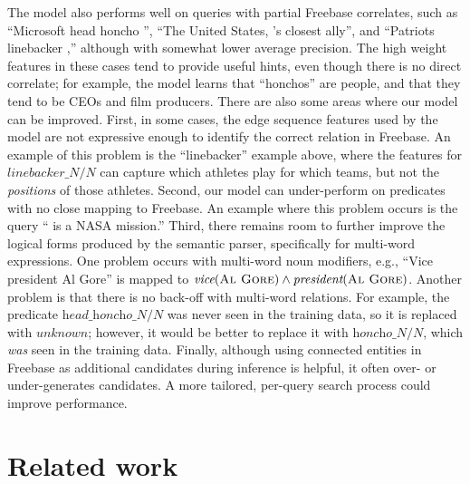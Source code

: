 \documentclass[11pt,letterpaper]{article}
\newcommand{\blank}{\underline{\hspace{.5cm}}}
\newcommand{\lexicalpredicate}[1]{\ensuremath{\textit{#1}}}
\newcommand{\entity}[1]{\ensuremath{\textsc{#1}}}
\begin{document}
The model also performs well on queries with partial Freebase correlates, such as ``Microsoft head
honcho \blank{}'', ``The United States, \blank{}'s closest ally'', and ``Patriots linebacker
\blank{},'' although with somewhat lower average precision. The high weight features in these cases
tend to provide useful hints, even though there is no direct correlate; for example, the model
learns that ``honchos'' are people, and that they tend to be CEOs and film producers.  There are also some areas where our model can be improved. First, in some cases, the edge sequence
features used by the model are not expressive enough to identify the correct relation in Freebase.
An example of this problem is the ``linebacker'' example above, where the features for
\lexicalpredicate{linebacker\_N/N} can capture which athletes play for which teams, but not the
\emph{positions} of those athletes. Second, our model can under-perform on predicates with no close
mapping to Freebase. An example where this problem occurs is the query ``\blank{} is a NASA
mission.'' Third, there remains room to further improve the logical forms produced by the semantic
parser, specifically for multi-word expressions. One problem occurs with multi-word noun modifiers,
e.g., ``Vice president Al Gore'' is mapped to $\lexicalpredicate{vice}(\entity{Al Gore}) \land
\lexicalpredicate{president}(\entity{Al Gore})$. Another problem is that there is no back-off with
multi-word relations. For example, the predicate \lexicalpredicate{head\_honcho\_N/N} was never
seen in the training data, so it is replaced with \lexicalpredicate{unknown}; however, it would be
better to replace it with \lexicalpredicate{honcho\_N/N}, which \emph{was} seen in the training
data. Finally, although using connected entities in Freebase as additional candidates during
inference is helpful, it often over- or under-generates candidates. A more tailored, per-query
search process could improve performance.

\vspace{-1.00mm}
\section{Related work}
\end{document}
